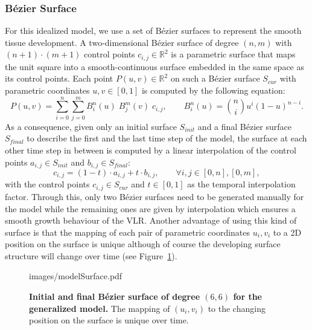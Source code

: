 \documentclass[11pt,a4paper, final]{article}
\begin{document}
\subsubsection{B\'ezier Surface}
For this idealized model, we use a set of B\'ezier surfaces to represent the smooth tissue development. A two-dimensional B\'ezier surface of degree $(n, m)$ with $(n+1) \cdot (m+1)$ control points $c_{i, j} \in \mathbb{R}^2$ is a parametric surface that maps the unit square into a smooth-continuous surface embedded in the same space as its control points. Each point $P(u, v) \in \mathbb{R}^2$ on such a B\'ezier surface $S_{cur}$ with parametric coordinates $u ,v \in [0,1]$ is computed by the following equation:
\begin{equation}
P(u, v) = \sum_{i=0}^{n} \sum_{j=0}^{m} B_{i}^{n} (u) \; B_{j}^{m} (v) \; c_{i,j}, \qquad B_{i}^{n} (u) = \binom{n}{i} u^i (1-u)^{n-i}.
\end{equation}
As a consequence, given only an initial surface $S_{init}$ and a final B\'ezier surface $S_{final}$ to describe the first and the last time step of the model, the surface at each other time step in between is computed by a linear interpolation of the control points $a_{i,j} \in S_{init}$ and $b_{i,j} \in S_{final}$:
\begin{equation}
c_{i,j} = (1-t) \cdot a_{i,j} + t \cdot b_{i,j}, \qquad \forall i, j \in [0, n], [0, m],
\end{equation}
with the control points $c_{i,j} \in S_{cur}$ and $t \in [0,1]$ as the temporal interpolation factor. Through this, only two B\'ezier surfaces need to be generated manually for the model while the remaining ones are given by interpolation which ensures a smooth growth behaviour of the VLR. Another advantage of using this kind of surface is that the mapping of each pair of parametric coordinates $u_i, v_i$ to a 2D position on the surface is unique although of course the developing surface structure will change over time (see Figure~\ref{fig:modelSurface}).
%
\begin{figure}[htbp]
	\begin{center}
		\begin{overpic}[width=0.8\linewidth]{images/modelSurface.pdf}
		\end{overpic}
\caption[Initial and final B\'ezier surface of degree $(6, 6)$ for the generalized model.]
{
{\bf Initial and final B\'ezier surface of degree $(6, 6)$ for the generalized model.} The mapping of $(u_i, v_i)$ to the changing position on the surface is unique over time.
}
	\label{fig:modelSurface}
	\end{center}
\end{figure}
%
\end{document}
